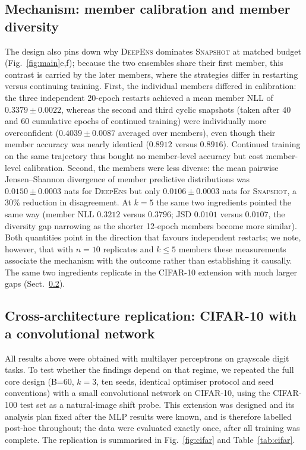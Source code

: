\documentclass[11pt,a4paper]{article}
\newcommand{\deepens}{\textsc{DeepEns}}
\newcommand{\snapshot}{\textsc{Snapshot}}
\begin{document}
\subsection{Mechanism: member calibration and member diversity}
\label{sec:results-mech}

The design also pins down why \deepens{} dominates \snapshot{} at matched
budget (Fig.~\ref{fig:main}e,f); because the two ensembles share their
first member, this contrast is carried by the later members, where the
strategies differ in restarting versus continuing training. First, the
individual members differed in calibration: the three independent 20-epoch
restarts achieved a mean member NLL of $0.3379 \pm 0.0022$, whereas the
second and third cyclic snapshots (taken after 40 and 60 cumulative epochs
of continued training) were individually more overconfident ($0.4039 \pm
0.0087$ averaged over members), even though their member accuracy was
nearly identical ($0.8912$ versus $0.8916$). Continued training on the
same trajectory thus bought no member-level accuracy but cost
member-level calibration. Second, the members were less diverse: the mean
pairwise Jensen--Shannon divergence of member predictive distributions was
$0.0150 \pm 0.0003$ nats for \deepens{} but only $0.0106 \pm 0.0003$ nats
for \snapshot{}, a 30\% reduction in disagreement. At $k=5$ the same two
ingredients pointed the same way (member NLL $0.3212$ versus $0.3796$; JSD
$0.0101$ versus $0.0107$, the diversity gap narrowing as the shorter
12-epoch members become more similar). Both quantities point in the
direction that favours independent restarts; we note, however, that with
$n=10$ replicates and $k \leq 5$ members these measurements associate the
mechanism with the outcome rather than establishing it causally. The same
two ingredients replicate in the CIFAR-10 extension with much larger gaps
(Sect.~\ref{sec:results-cifar}).

\subsection{Cross-architecture replication: CIFAR-10 with a convolutional
network}\label{sec:results-cifar}

All results above were obtained with multilayer perceptrons on grayscale
digit tasks. To test whether the findings depend on that regime, we repeated
the full core design (B=60, $k=3$, ten seeds, identical optimiser protocol
and seed conventions) with a small convolutional network on CIFAR-10, using
the CIFAR-100 test set as a natural-image shift probe. This extension was
designed and its analysis plan fixed after the MLP results were known, and
is therefore labelled post-hoc throughout; the data were evaluated exactly
once, after all training was complete. The replication is summarised in
Fig.~\ref{fig:cifar} and Table~\ref{tab:cifar}.
\end{document}
